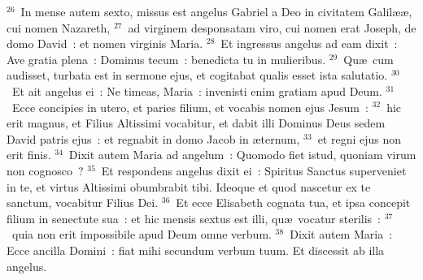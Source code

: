 ${}^{26}$~In mense autem sexto, missus est angelus Gabriel a Deo in civitatem Galil\ae \ae , cui nomen Nazareth,
${}^{27}$~ad virginem desponsatam viro, cui nomen erat Joseph, de domo David~: et nomen virginis Maria.
${}^{28}$~Et ingressus angelus ad eam dixit~: Ave gratia plena~: Dominus tecum~: benedicta tu in mulieribus.
${}^{29}$~Qu\ae\ cum audisset, turbata est in sermone ejus, et cogitabat qualis esset ista salutatio.
${}^{30}$~Et ait angelus ei~: Ne timeas, Maria~: invenisti enim gratiam apud Deum.
${}^{31}$~Ecce concipies in utero, et paries filium, et vocabis nomen ejus Jesum~:
${}^{32}$~hic erit magnus, et Filius Altissimi vocabitur, et dabit illi Dominus Deus sedem David patris ejus~: et regnabit in domo Jacob in \ae ternum,
${}^{33}$~et regni ejus non erit finis.
${}^{34}$~Dixit autem Maria ad angelum~: Quomodo fiet istud, quoniam virum non cognosco~?
${}^{35}$~Et respondens angelus dixit ei~: Spiritus Sanctus superveniet in te, et virtus Altissimi obumbrabit tibi. Ideoque et quod nascetur ex te sanctum, vocabitur Filius Dei.
${}^{36}$~Et ecce Elisabeth cognata tua, et ipsa concepit filium in senectute sua~: et hic mensis sextus est illi, qu\ae\ vocatur sterilis~:
${}^{37}$~quia non erit impossibile apud Deum omne verbum.
${}^{38}$~Dixit autem Maria~: Ecce ancilla Domini~: fiat mihi secundum verbum tuum. Et discessit ab illa angelus.


